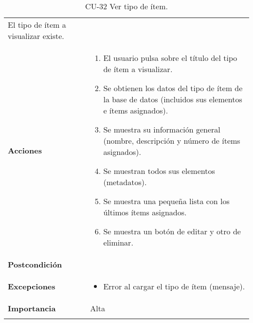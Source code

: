 \begin{longtable}[]{@{}ll@{}}
\begin{minipage}[t]{0.76\columnwidth}
El tipo de ítem a visualizar existe.\strut
\end{minipage}\tabularnewline
\begin{minipage}[t]{0.18\columnwidth}\raggedright
\textbf{Acciones}\strut
\end{minipage} & \begin{minipage}[t]{0.76\columnwidth}\raggedright
\begin{enumerate}
\def\labelenumi{\arabic{enumi}.}
\tightlist
\item
  El usuario pulsa sobre el título del tipo de ítem a visualizar.
\item
  Se obtienen los datos del tipo de ítem de la base de datos (incluidos
  sus elementos e ítems asignados).
\item
  Se muestra su información general (nombre, descripción y número de
  ítems asignados).
\item
  Se muestran todos sus elementos (metadatos).
\item
  Se muestra una pequeña lista con los últimos ítems asignados.
\item
  Se muestra un botón de editar y otro de eliminar.
\end{enumerate}\strut
\end{minipage}\tabularnewline
\begin{minipage}[t]{0.18\columnwidth}\raggedright
\textbf{Postcondición}\strut
\end{minipage} & \begin{minipage}[t]{0.76\columnwidth}\raggedright
\strut
\end{minipage}\tabularnewline
\begin{minipage}[t]{0.18\columnwidth}\raggedright
\textbf{Excepciones}\strut
\end{minipage} & \begin{minipage}[t]{0.76\columnwidth}\raggedright
\begin{itemize}
\tightlist
\item
  Error al cargar el tipo de ítem (mensaje).
\end{itemize}\strut
\end{minipage}\tabularnewline
\begin{minipage}[t]{0.18\columnwidth}\raggedright
\textbf{Importancia}\strut
\end{minipage} & \begin{minipage}[t]{0.76\columnwidth}\raggedright
Alta\strut
\end{minipage}\tabularnewline
\bottomrule
\caption{CU-32 Ver tipo de ítem.}
\end{longtable}

